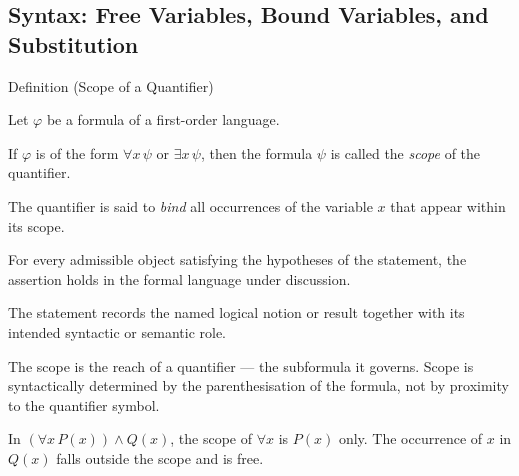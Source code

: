 
\subsection{Syntax: Free Variables, Bound Variables, and Substitution}


\begin{definitionbox}{Definition (Scope of a Quantifier)}
\begin{definition}\label{def:scope}
Let $\varphi$ be a formula of a first-order language.

If $\varphi$ is of the form $\forall x\,\psi$ or $\exists x\,\psi$, then the
formula $\psi$ is called the \emph{scope} of the quantifier.

The quantifier is said to \emph{bind} all occurrences of the variable $x$ that
appear within its scope.
\end{definition}
\end{definitionbox}
\begin{remark*}
For every admissible object satisfying the hypotheses of the statement, the
assertion holds in the formal language under discussion.
\end{remark*}

\begin{remark*}[Interpretation]
The statement records the named logical notion or result together with its
intended syntactic or semantic role.
\end{remark*}


\begin{remark*}[Exposition]
The scope is the reach of a quantifier --- the subformula it governs. Scope is
syntactically determined by the parenthesisation of the formula, not by
proximity to the quantifier symbol.
\end{remark*}

\begin{remark*}[Examples]
In $(\forall x\,P(x)) \wedge Q(x)$, the scope of $\forall x$ is $P(x)$ only.
The occurrence of $x$ in $Q(x)$ falls outside the scope and is free.
\end{remark*}

